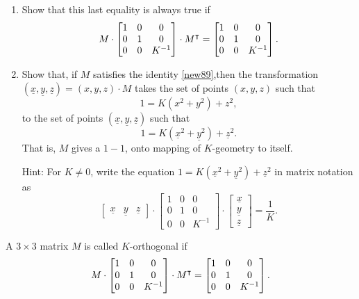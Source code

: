 \documentclass{ximera}
\begin{document}
\begin{problem}\hfil
\label{87}
\begin{enumerate}
\item  Show that this last equality is always true if%
\begin{equation}
M\cdot\begin{bmatrix}
1 & 0 & 0\\
0 & 1 & 0\\
0 & 0 & K^{-1}%
\end{bmatrix}
\cdot M^\transpose=
\begin{bmatrix}
1 & 0 & 0\\
0 & 1 & 0\\
0 & 0 & K^{-1}%
\end{bmatrix}. \label{new89}%
\end{equation}

\item Show that, if $M$ satisfies the identity \ref{new89},then the
transformation $\left(  \underline{x},\underline{y},\underline{z}\right)
=\left(  x,y,z\right)  \cdot M$ takes the set of points $\left(  x,y,z\right)
$ such that%
\[
1=K\left(  x^{2}+y^{2}\right)  +z^{2},
\]
to the set of points $\left(  \underline{x},\underline{y},\underline
{z}\right)  $ such that%
\[
1=K\left(  \underline{x}^{2}+\underline{y}^{2}\right)  +\underline{z}^{2}.
\]
That is, $M$ gives a $1-1$, onto mapping of $K$-geometry to itself.

Hint: For $K\neq0$, write the equation $1=K\left(  \underline{x}%
^{2}+\underline{y}^{2}\right)  +\underline{z}^{2}$ in matrix notation as%
\[
\begin{bmatrix}
\underline{x} & \underline{y} & \underline{z}%
\end{bmatrix}  \cdot\begin{bmatrix}
1 & 0 & 0\\
0 & 1 & 0\\
0 & 0 & K^{-1}%
\end{bmatrix}  \cdot
\begin{bmatrix}
\underline{x}\\
\underline{y}\\
\underline{z}%
\end{bmatrix}  =\frac{1}{K}.
\]
\end{enumerate}
\end{problem}

\begin{definition}
\label{88}A $3\times3$ matrix $M$ is called $K$-orthogonal if
\[
M\cdot\begin{bmatrix}
1 & 0 & 0\\
0 & 1 & 0\\
0 & 0 & K^{-1}%
\end{bmatrix}  \cdot M^\transpose=\begin{bmatrix}
1 & 0 & 0\\
0 & 1 & 0\\
0 & 0 & K^{-1}%
\end{bmatrix}  .
\]

\end{definition}
\end{document}
